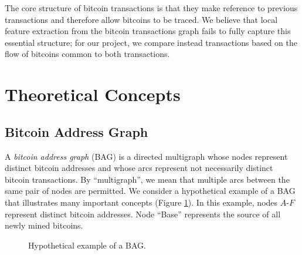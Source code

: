 \documentclass[letterpaper, 10 pt, conference]{ieeeconf}  %
\begin{document}
The core structure of bitcoin transactions is that they make reference to previous transactions and therefore allow bitcoins to be traced. We believe that local feature extraction from the bitcoin transactions graph fails to fully capture this essential structure; for our project, we compare instead transactions based on the flow of bitcoins common to both transactions.


\section{Theoretical Concepts}

\subsection{Bitcoin Address Graph}

A \emph{bitcoin address graph} (BAG) is a directed multigraph whose nodes represent distinct bitcoin addresses and whose arcs represent not necessarily distinct bitcoin transactions. By ``multigraph'', we mean that multiple arcs between the same pair of nodes are permitted. We consider a hypothetical example of a BAG that illustrates many important concepts (Figure \ref{bag}). In this example, nodes $A$-$F$ represent distinct bitcoin addresses. Node ``Base'' represents the source of all newly mined bitcoins.

\begin{figure}
\centering
{}
\caption{\label{bag} Hypothetical example of a BAG.}
\end{figure}
\end{document}
